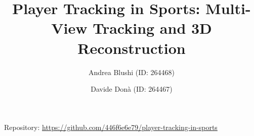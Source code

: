 \documentclass{llncs}
\begin{document}

\title{Player Tracking in Sports: Multi-View Tracking and 3D Reconstruction}
\author{Andrea Blushi (ID: 264468) \and Davide Don\`{a} (ID: 264467)}
\maketitle
\begin{center}
	\small Repository: \url{https://github.com/446f6e6e79/player-tracking-in-sports}
\end{center}







\newpage




\end{document}

